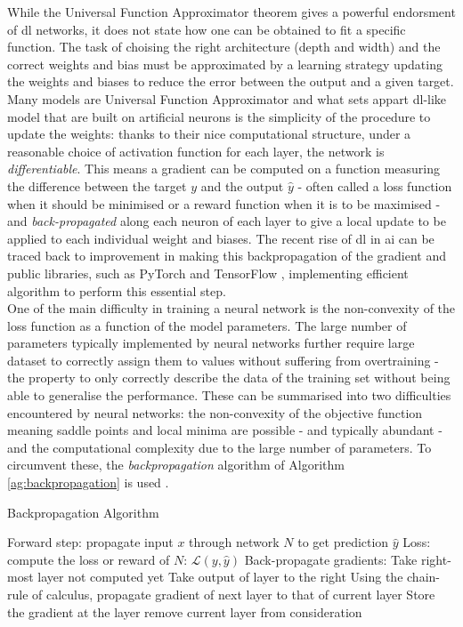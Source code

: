 While the Universal Function Approximator theorem gives a powerful endorsment of \gls{dl} networks, it does not state how one can be obtained to fit a specific function. The task of choising the right architecture (depth and width) and the correct weights and bias must be approximated by a learning strategy updating the weights and biases to reduce the error between the output and a given target. Many models are Universal Function Approximator and what sets appart \gls{dl}-like model that are built on artificial neurons is the simplicity of the procedure to update the weights: thanks to their nice computational structure, under a reasonable choice of activation function for each layer, the network is \textit{differentiable}. This means a gradient can be computed on a function measuring the difference between the target $y$ and the output $\hat{y}$ - often called a loss function when it should be minimised or a reward function when it is to be maximised - and \textit{back-propagated} along each neuron of each layer to give a local update to be applied to each individual weight and biases. The recent rise of \gls{dl} in \gls{ai} can be traced back to improvement in making this backpropagation of the gradient and public libraries, such as PyTorch \cite{pytorch} and TensorFlow \cite{tensorflow2015-whitepaper}, implementing efficient algorithm to perform this essential step. \\
One of the main difficulty in training a neural network is the non-convexity of the loss function as a function of the model parameters. The large number of parameters typically implemented by neural networks further require large dataset to correctly assign them to values without suffering from overtraining - the property to only correctly describe the data of the training set without being able to generalise the performance. These can be summarised into two difficulties encountered by neural networks: the non-convexity of the objective function meaning saddle points and local minima are possible - and typically abundant - and the computational complexity due to the large number of parameters. To circumvent these, the \textit{backpropagation} algorithm of Algorithm \ref{ag:backpropagation} is used \cite{backprop}.

\begin{algorithm}
    \caption{Backpropagation Algorithm}
    \begin{algorithmic}
        \State Forward step: propagate input $x$ through network $N$ to get prediction $\hat{y}$
        \State Loss: compute the loss or reward of $N$: $\mathcal{L}(y, \hat{y})$
        \State Back-propagate gradients:
            \State Take right-most layer not computed yet 
            \State Take output of layer to the right 
            \State Using the chain-rule of calculus, propagate gradient of next layer to that of current layer
            \State Store the gradient at the layer
            \State remove current layer from consideration
        \EndWhile
    \EndFunction
    \end{algorithmic}
    \label{ag:backpropagation}
\end{algorithm}

